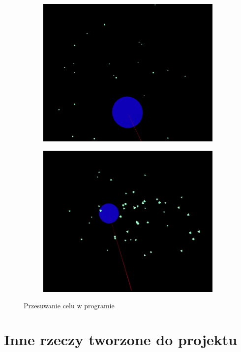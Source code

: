 \documentclass[a4paper,12pt,reqno]{article}
\begin{document}
\begin{figure}[H]%
	\centering
	\begin{subfigure}{.5\textwidth}
		\centering
		\includegraphics[width=0.8\linewidth]{graphics//boids/BoidsInUE_3.png}
		\label{ref:subref_a}
	\end{subfigure}%
	\begin{subfigure}{.5\textwidth}
		\centering
		\includegraphics[width=0.8\linewidth]{graphics//boids/BoidsInUE_4.png}
		\label{ref:subref_b}
	\end{subfigure}%
\caption{Przesuwanie celu w programie}
\label{ref:ref}
\end{figure}


\newpage
\section{Inne rzeczy tworzone do projektu}
\end{document}
